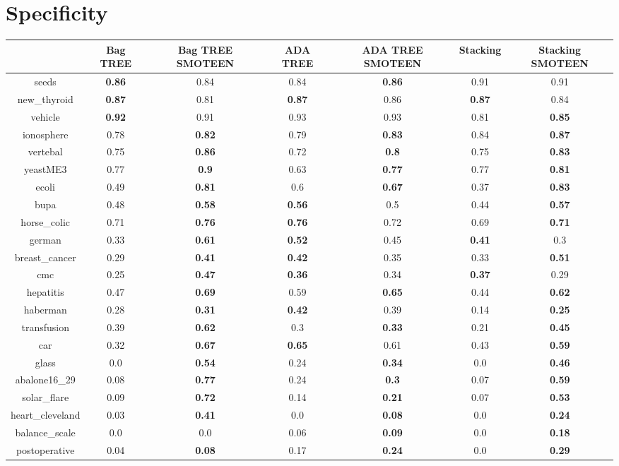 \documentclass{article}%
\begin{document}
%
\section*{Specificity}%
\begin{tabular}{c|cccccc}%
&Bag TREE&Bag TREE SMOTEEN&ADA TREE&ADA TREE SMOTEEN&Stacking&Stacking SMOTEEN\\%
\hline%
seeds&\textbf{0.86}&0.84&0.84&\textbf{0.86}&0.91&0.91\\%
new\_thyroid&\textbf{0.87}&0.81&\textbf{0.87}&0.86&\textbf{0.87}&0.84\\%
vehicle&\textbf{0.92}&0.91&0.93&0.93&0.81&\textbf{0.85}\\%
ionosphere&0.78&\textbf{0.82}&0.79&\textbf{0.83}&0.84&\textbf{0.87}\\%
vertebal&0.75&\textbf{0.86}&0.72&\textbf{0.8}&0.75&\textbf{0.83}\\%
yeastME3&0.77&\textbf{0.9}&0.63&\textbf{0.77}&0.77&\textbf{0.81}\\%
ecoli&0.49&\textbf{0.81}&0.6&\textbf{0.67}&0.37&\textbf{0.83}\\%
bupa&0.48&\textbf{0.58}&\textbf{0.56}&0.5&0.44&\textbf{0.57}\\%
horse\_colic&0.71&\textbf{0.76}&\textbf{0.76}&0.72&0.69&\textbf{0.71}\\%
german&0.33&\textbf{0.61}&\textbf{0.52}&0.45&\textbf{0.41}&0.3\\%
breast\_cancer&0.29&\textbf{0.41}&\textbf{0.42}&0.35&0.33&\textbf{0.51}\\%
cmc&0.25&\textbf{0.47}&\textbf{0.36}&0.34&\textbf{0.37}&0.29\\%
hepatitis&0.47&\textbf{0.69}&0.59&\textbf{0.65}&0.44&\textbf{0.62}\\%
haberman&0.28&\textbf{0.31}&\textbf{0.42}&0.39&0.14&\textbf{0.25}\\%
transfusion&0.39&\textbf{0.62}&0.3&\textbf{0.33}&0.21&\textbf{0.45}\\%
car&0.32&\textbf{0.67}&\textbf{0.65}&0.61&0.43&\textbf{0.59}\\%
glass&0.0&\textbf{0.54}&0.24&\textbf{0.34}&0.0&\textbf{0.46}\\%
abalone16\_29&0.08&\textbf{0.77}&0.24&\textbf{0.3}&0.07&\textbf{0.59}\\%
solar\_flare&0.09&\textbf{0.72}&0.14&\textbf{0.21}&0.07&\textbf{0.53}\\%
heart\_cleveland&0.03&\textbf{0.41}&0.0&\textbf{0.08}&0.0&\textbf{0.24}\\%
balance\_scale&0.0&0.0&0.06&\textbf{0.09}&0.0&\textbf{0.18}\\%
postoperative&0.04&\textbf{0.08}&0.17&\textbf{0.24}&0.0&\textbf{0.29}\\%
\end{tabular}
\end{document}
